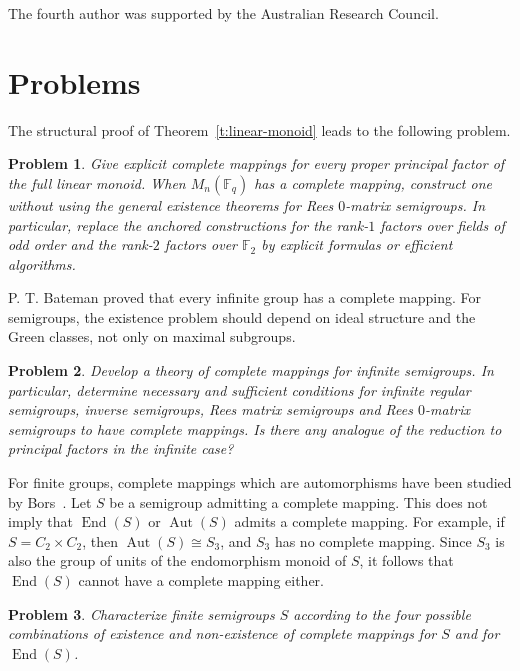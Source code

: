 \documentclass[11pt]{article}
\theoremstyle{plain}
\newtheorem{problem}{Problem}[section]
\theoremstyle{remark}
\theoremstyle{definition}
\theoremstyle{plain}
\newcommand{\End}{\mathop{\mathrm{End}}}
\newcommand{\Aut}{\mathop{\mathrm{Aut}}}
\begin{document}
The fourth author was supported by the Australian Research Council.

\section{Problems}
\label{Sec:problems}

{
The structural proof of Theorem~\ref{t:linear-monoid} leads to the following
problem.

\begin{problem}\label{p:matrix-monoids}
Give explicit complete mappings for every proper principal factor of the full
linear monoid. When $M_n(\mathbb F_q)$ has a complete mapping, construct one
without using the general existence theorems for Rees $0$-matrix semigroups.
In particular, replace the anchored constructions for the rank-$1$ factors
over fields of odd order and the rank-$2$ factors over $\mathbb F_2$ by
explicit formulas or efficient algorithms.
\end{problem}
}

P. T. Bateman \cite[Theorem]{Bateman} proved that every infinite group has a complete mapping. For semigroups, the existence problem should depend on ideal structure and the Green classes, not only on maximal subgroups.

\begin{problem}\label{p:infinite-semigroups}
Develop a theory of complete mappings for infinite semigroups. In particular, determine necessary and sufficient conditions for infinite regular semigroups, inverse semigroups, Rees matrix semigroups and Rees $0$-matrix semigroups to have complete mappings. Is there any analogue of the reduction to principal factors in the infinite case?
\end{problem}

For finite groups, complete mappings which are automorphisms have been studied by Bors~\cite{bors}. Let $S$ be a semigroup admitting a complete mapping. This does not imply that
$\End(S)$ or $\Aut(S)$ admits a complete mapping. For example, if
$S=C_2\times C_2$, then $\Aut(S)\cong S_3$, and $S_3$ has no complete mapping.
Since $S_3$ is also the group of units of the endomorphism monoid of $S$, it
follows that $\End(S)$ cannot have a complete mapping either.

\begin{problem}
Characterize finite semigroups $S$ according to the four possible combinations
of existence and non-existence of complete mappings for $S$ and for $\End(S)$.
\end{problem}
\end{document}
